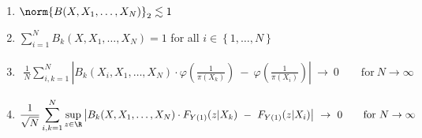 \begin{lemma}
  \begin{enumerate}[label=(\roman*)]
    \item
      $\norm{B(X,X_1,\ldots,X_N)}_2\lesssim 1$ 
      \item
      $
      \sum_{i=1}^{N}
        B_k(X,X_1,\ldots,X_N)
        =1
      $
      for all $i\in \left\{
        1,\ldots,N
      \right\}$
      \item
      \begin{align*}
        \frac
        {1}
        {N}
        \sum_{i,k=1}^{N}
            \left|
        B_k(X_i,X_1,\ldots,X_N)
        \cdot
            \varphi
            \left(
              \frac
              {1}
              {\pi(X_k)}
            \right)
            \ 
            -
            \ 
            \varphi
            \left(
              \frac
              {1}
              {\pi(X_i)}
            \right)
            \right|
            \ 
            \to
            \ 
            0
            \qquad
            \text{for}
            \ 
            N\to\infty
          \end{align*}
\item
      \begin{align*}
        \frac
        {1}
        {\sqrt{N}}
        \sum_{i,k=1}^{N}
        \sup_{z\in\R}
            \left|
        B_k(X,X_1,\ldots,X_N)
        \cdot
        F_{Y(1)}(z|X_k)
            \ 
            -
            \ 
        F_{Y(1)}(z|X_i)
            \right|
            \ 
            \to
            \ 
            0
            \qquad
            \text{for}
            \ 
            N\to\infty
      \end{align*}
\end{enumerate}
\end{lemma}
